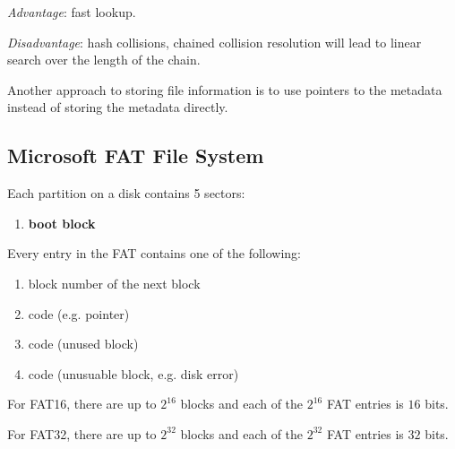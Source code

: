 \textit{Advantage}: fast lookup.

\textit{Disadvantage}: hash collisions, chained collision resolution will lead to linear search over the length of the chain.

Another approach to storing file information is to use pointers to the metadata instead of storing the metadata directly.


\subsection{Microsoft FAT File System}
Each partition on a disk contains 5 sectors:
\begin{enumerate}
    \item{\textbf{boot block}}
\end{enumerate}

Every entry in the FAT contains one of the following:
\begin{enumerate}
    \item block number of the next block
    \item {} code (e.g.  pointer)
    \item {} code (unused block)
    \item {} code (unusuable block, e.g. disk error)
\end{enumerate}

For FAT16, there are up to $2^{16}$ blocks and each of the $2^{16}$ FAT entries is $16$ bits.

For FAT32, there are up to $2^{32}$ blocks and each of the $2^{32}$ FAT entries is $32$ bits.

